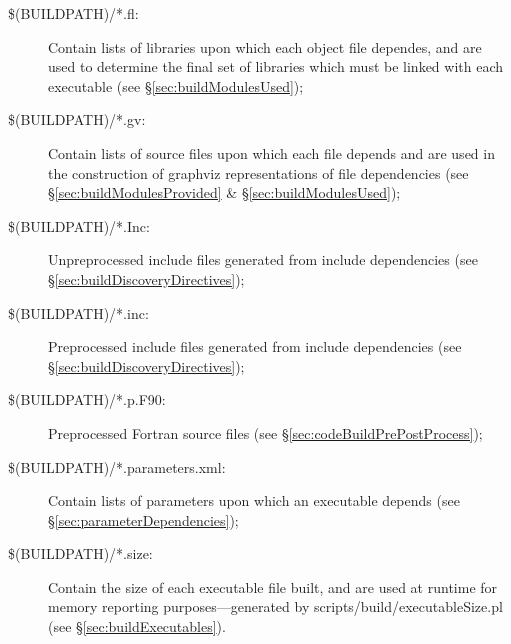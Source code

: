 \begin{description}
\item[{\normalfont \ttfamily \$(BUILDPATH)/*.fl}:] Contain lists of libraries upon which each object file dependes, and are used to determine the final set of libraries which must be linked with each executable (see \S\ref{sec:buildModulesUsed});

\item[{\normalfont \ttfamily \$(BUILDPATH)/*.gv}:] Contain lists of source files upon which each file depends and are used in the construction of \gls{graphviz} representations of file dependencies (see \S\ref{sec:buildModulesProvided} \& \S\ref{sec:buildModulesUsed});

\item[{\normalfont \ttfamily \$(BUILDPATH)/*.Inc}:] Unpreprocessed include files generated from {\normalfont \ttfamily include} dependencies (see \S\ref{sec:buildDiscoveryDirectives});

\item[{\normalfont \ttfamily \$(BUILDPATH)/*.inc}:] Preprocessed include files generated from {\normalfont \ttfamily include} dependencies (see \S\ref{sec:buildDiscoveryDirectives});

\item[{\normalfont \ttfamily \$(BUILDPATH)/*.p.F90}:] Preprocessed Fortran source files (see \S\ref{sec:codeBuildPrePostProcess});

\item[{\normalfont \ttfamily \$(BUILDPATH)/*.parameters.xml}:] Contain lists of parameters upon which an executable depends (see \S\ref{sec:parameterDependencies});

\item[{\normalfont \ttfamily \$(BUILDPATH)/*.size}:] Contain the size of each executable file built, and are used at runtime for memory reporting purposes---generated by {\normalfont \ttfamily scripts/build/executableSize.pl} (see \S\ref{sec:buildExecutables}).
\end{description}
